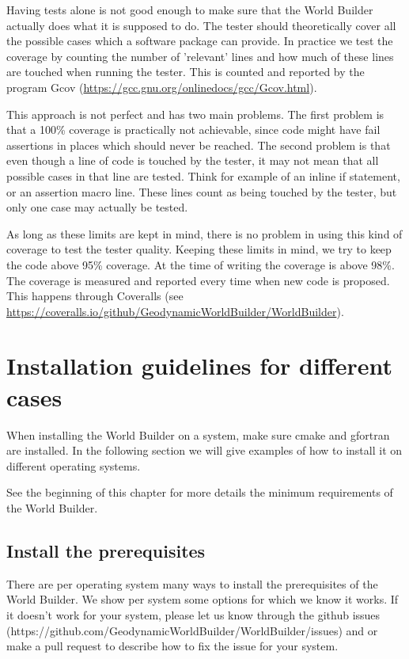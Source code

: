 \documentclass{book}
\newcommand{\WB}{{World Builder}}
\newcommand{\cmake}{{cmake}}
\newcommand{\gcov}{{Gcov}}
\begin{document}
Having tests alone is not good enough to make sure that the \WB{} actually does what it is supposed to do. The tester should theoretically cover all the possible cases which a software package can provide. In practice we test the coverage by counting the number of 'relevant' lines and how much of these lines are touched when running the tester. This is counted and reported by the program \gcov{} (\url{https://gcc.gnu.org/onlinedocs/gcc/Gcov.html}).

This approach is not perfect and has two main problems. The first problem is that a 100\% coverage is practically not achievable, since code might have fail assertions in places which should never be reached. The second problem is that even though a line of code is touched by the tester, it may not mean that all possible cases in that line are tested. Think for example of an inline if statement, or an assertion macro line. These lines count as being touched by the tester, but only one case may actually be tested.

As long as these limits are kept in mind, there is no problem in using this kind of coverage to test the tester quality. Keeping these limits in mind, we try to keep the code above 95\% coverage. At the time of writing the coverage is above 98\%. The coverage is measured and reported every time when new code is proposed. This happens through Coveralls (see \url{https://coveralls.io/github/GeodynamicWorldBuilder/WorldBuilder}).


\section{Installation guidelines for different cases}
\label{section:installation_for_different_cases}
When installing the \WB{} on a system, make sure \cmake{} and gfortran are installed. In the following section we will give examples of how to install it on different operating systems.
\begin{remark}
See the beginning of this chapter for more details the minimum requirements of the \WB{}.
\end{remark}

\subsection{Install the prerequisites}
There are per operating system many ways to install the prerequisites of the \WB{}. We show per system some options for which we know it works. If it doesn't work for your system, please let us know through the github issues (https://github.com/GeodynamicWorldBuilder/WorldBuilder/issues) and or make a pull request to describe how to fix the issue for your system.
\end{document}
